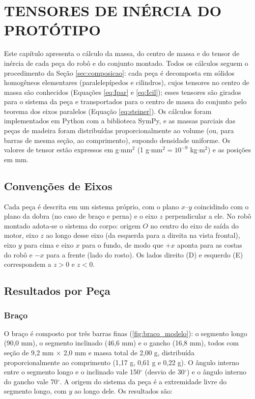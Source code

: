 \chapter{TENSORES DE INÉRCIA DO PROTÓTIPO}
\label{chapter:inercia}

Este capítulo apresenta o cálculo da massa, do centro de massa e do tensor de inércia de cada peça do robô e do conjunto montado. Todos os cálculos seguem o procedimento da Seção \ref{sec:composicao}: cada peça é decomposta em sólidos homogêneos elementares (paralelepípedos e cilindros), cujos tensores no centro de massa são conhecidos (Equações \ref{eq:Ipar} e \ref{eq:Icil}); esses tensores são girados para o sistema da peça e transportados para o centro de massa do conjunto pelo teorema dos eixos paralelos (Equação \ref{eq:steiner}). Os cálculos foram implementados em Python com a biblioteca SymPy, e as massas parciais das peças de madeira foram distribuídas proporcionalmente ao volume (ou, para barras de mesma seção, ao comprimento), supondo densidade uniforme. Os valores de tensor estão expressos em g$\cdot$mm$^2$ (1 g$\cdot$mm$^2 = 10^{-9}$ kg$\cdot$m$^2$) e as posições em mm.

\section{Convenções de Eixos}
\label{sec:eixos}

Cada peça é descrita em um sistema próprio, com o plano $x$--$y$ coincidindo com o plano da dobra (no caso de braço e perna) e o eixo $z$ perpendicular a ele. No robô montado adota-se o sistema do corpo: origem $O$ no centro do eixo de saída do motor, eixo $z$ ao longo desse eixo (da esquerda para a direita na vista frontal), eixo $y$ para cima e eixo $x$ para o fundo, de modo que $+x$ aponta para as costas do robô e $-x$ para a frente (lado do rosto). Os lados direito (D) e esquerdo (E) correspondem a $z>0$ e $z<0$.

\section{Resultados por Peça}
\label{sec:resultados_pecas}

\subsection{Braço}

O braço é composto por três barras finas (\ref{fig:braco_modelo}): o segmento longo (90,0 mm), o segmento inclinado (46,6 mm) e o gancho (16,8 mm), todos com seção de 9,2 mm $\times$ 2,0 mm e massa total de 2,00 g, distribuída proporcionalmente ao comprimento (1,17 g, 0,61 g e 0,22 g). O ângulo interno entre o segmento longo e o inclinado vale 150$^\circ$ (desvio de 30$^\circ$) e o ângulo interno do gancho vale 70$^\circ$. A origem do sistema da peça é a extremidade livre do segmento longo, com $y$ ao longo dele. Os resultados são:


